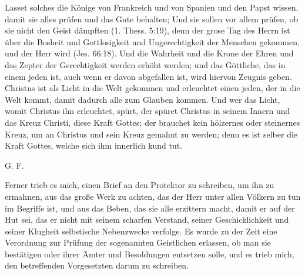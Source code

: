 {    Lasset solches die Könige von Frankreich und von Spanien
    und den Papst wissen, damit sie alles prüfen und das Gute behalten;
    Und sie sollen vor allem prüfen, ob sie nicht den Geist dämpften
    (1. Thess. 5:19), 
    denn der grose Tag des Herrn ist über die
    Bosheit und Gottlosigkeit und Ungerechtigkeit der Menschen
    gekommen, und der Herr wird  (Jes. 66:18). 
    Und die Wahrheit
    und die Krone der Ehren und das Zepter der Gerechtigkeit
    werden erhöht werden; und das Göttliche, das in einem jeden
    ist, auch wenn er davon abgefallen ist, wird hiervon Zeugnis
    geben. Christus ist als Licht in die Welt gekommen und erleuchtet
    einen jeden, der in die Welt kommt, damit dadurch alle zum
    Glauben kommen. Und wer das Licht, womit Christus ihn
    erleuchtet, spürt, der spüret Christus in seinem Innern und das
    Kreuz Christi, diese Kraft Gottes; der brauchet kein hölzernes oder
    steinernes Kreuz, 
    um an Christus und sein Kreuz gemahnt zu
    werden; denn es ist selber die Kraft Gottes, welche sich ihm
    innerlich kund tut.
    \bigskip
    \begin{flushright}G. F.\end{flushright}
}

Ferner trieb es mich, einen Brief an den Protektor zu
schreiben, um ihn zu ermahnen, aus das große Werk zu achten,
das der Herr unter allen Völkern zu tun im Begriffe ist, und
aus das Beben, das sie alle erzittern macht, damit er auf der
Hut sei, das er nicht mit seinem scharfen Verstand, seiner 
Geschicklichkeit und seiner Klugheit selbstische Nebenzwecke verfolge.
Es wurde zu der Zeit eine Verordnung zur Prüfung der
sogenannten Geistlichen erlassen, ob man sie bestätigen oder ihrer
Ämter und Besoldungen entsetzen solle, und es trieb mich, den
betreffenden Vorgesetzten darum zu schreiben.

